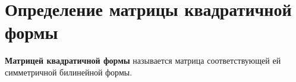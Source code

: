 \section{Определение матрицы квадратичной формы}

\begin{definition}
\textbf{Матрицей квадратичной формы} называется матрица соответствующей ей симметричной билинейной формы.
\end{definition}
